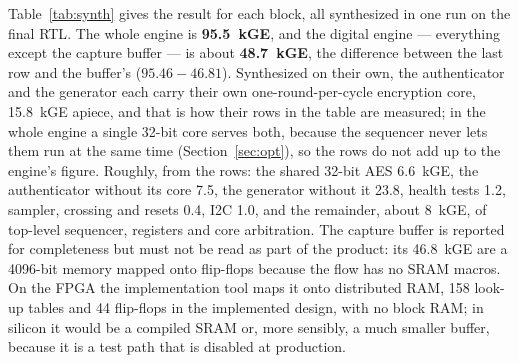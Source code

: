 Table~\ref{tab:synth} gives the result for each block, all synthesized in
one run on the final \ac{RTL}. The whole engine is \textbf{95.5~kGE}, and
the digital
engine --- everything except the capture buffer --- is about
\textbf{48.7~kGE}, the difference between the last row and the buffer's
($95.46 - 46.81$). Synthesized on their own, the authenticator and the
generator each carry their own one-round-per-cycle encryption core,
15.8~kGE apiece, and that is how their rows in the table are measured; in
the whole engine a single 32-bit core serves both, because the sequencer
never lets them run at the same time (Section~\ref{sec:opt}), so the rows
do not add up to the engine's figure. Roughly, from the rows: the shared
32-bit AES
6.6~kGE, the authenticator without its core 7.5, the generator without it
23.8, health tests 1.2, sampler, crossing and resets 0.4, \ac{I2C} 1.0,
and the remainder, about 8~kGE, of top-level sequencer, registers and
core arbitration.
The capture buffer is reported for completeness but must not be read as
part of the product: its 46.8~kGE are a 4096-bit memory mapped onto
flip-flops because the flow has no SRAM macros. On the \ac{FPGA} the
implementation tool maps it onto distributed RAM, 158 look-up tables and
44 flip-flops in the implemented design, with no block RAM; in silicon it
would be a compiled SRAM or,
more sensibly, a much smaller buffer, because it is a test path that is
disabled at production.

